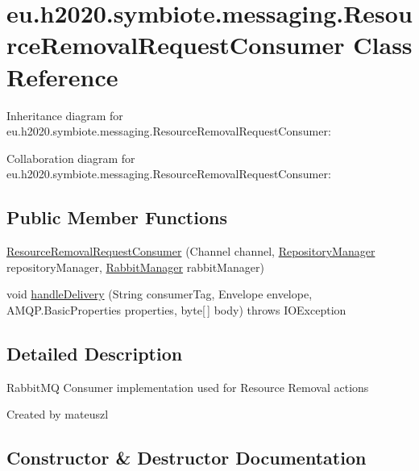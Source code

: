 \hypertarget{classeu_1_1h2020_1_1symbiote_1_1messaging_1_1ResourceRemovalRequestConsumer}{}\section{eu.\+h2020.\+symbiote.\+messaging.\+Resource\+Removal\+Request\+Consumer Class Reference}
\label{classeu_1_1h2020_1_1symbiote_1_1messaging_1_1ResourceRemovalRequestConsumer}


Inheritance diagram for eu.\+h2020.\+symbiote.\+messaging.\+Resource\+Removal\+Request\+Consumer\+:


Collaboration diagram for eu.\+h2020.\+symbiote.\+messaging.\+Resource\+Removal\+Request\+Consumer\+:
\subsection*{Public Member Functions}
\begin{DoxyCompactItemize}
\item 
\hyperlink{classeu_1_1h2020_1_1symbiote_1_1messaging_1_1ResourceRemovalRequestConsumer_aba5553aba270fe213d42a950e5c3ccd6}{Resource\+Removal\+Request\+Consumer} (Channel channel, \hyperlink{classeu_1_1h2020_1_1symbiote_1_1repository_1_1RepositoryManager}{Repository\+Manager} repository\+Manager, \hyperlink{classeu_1_1h2020_1_1symbiote_1_1messaging_1_1RabbitManager}{Rabbit\+Manager} rabbit\+Manager)
\item 
void \hyperlink{classeu_1_1h2020_1_1symbiote_1_1messaging_1_1ResourceRemovalRequestConsumer_acddf45d794a218a11e496d11e47dd01c}{handle\+Delivery} (String consumer\+Tag, Envelope envelope, A\+M\+Q\+P.\+Basic\+Properties properties, byte\mbox{[}$\,$\mbox{]} body)  throws I\+O\+Exception 
\end{DoxyCompactItemize}


\subsection{Detailed Description}
Rabbit\+MQ Consumer implementation used for Resource Removal actions

Created by mateuszl 

\subsection{Constructor \& Destructor Documentation}
